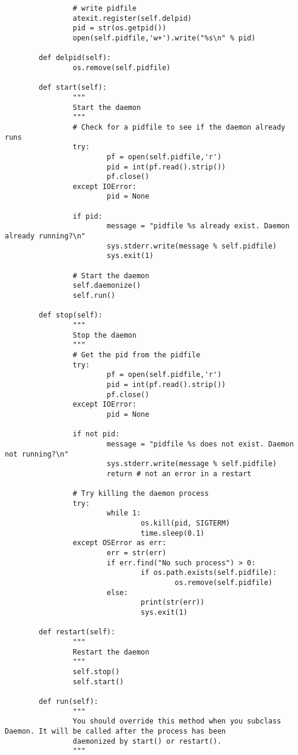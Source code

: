 \documentclass[12pt,a4paper]{scrartcl}
\begin{document}
\begin{verbatim}
                # write pidfile
                atexit.register(self.delpid)
                pid = str(os.getpid())
                open(self.pidfile,'w+').write("%s\n" % pid)

        def delpid(self):
                os.remove(self.pidfile)

        def start(self):
                """
                Start the daemon
                """
                # Check for a pidfile to see if the daemon already runs
                try:
                        pf = open(self.pidfile,'r')
                        pid = int(pf.read().strip())
                        pf.close()
                except IOError:
                        pid = None

                if pid:
                        message = "pidfile %s already exist. Daemon already running?\n"
                        sys.stderr.write(message % self.pidfile)
                        sys.exit(1)

                # Start the daemon
                self.daemonize()
                self.run()

        def stop(self):
                """
                Stop the daemon
                """
                # Get the pid from the pidfile
                try:
                        pf = open(self.pidfile,'r')
                        pid = int(pf.read().strip())
                        pf.close()
                except IOError:
                        pid = None

                if not pid:
                        message = "pidfile %s does not exist. Daemon not running?\n"
                        sys.stderr.write(message % self.pidfile)
                        return # not an error in a restart

                # Try killing the daemon process       
                try:
                        while 1:
                                os.kill(pid, SIGTERM)
                                time.sleep(0.1)
                except OSError as err:
                        err = str(err)
                        if err.find("No such process") > 0:
                                if os.path.exists(self.pidfile):
                                        os.remove(self.pidfile)
                        else:
                                print(str(err))
                                sys.exit(1)

        def restart(self):
                """
                Restart the daemon
                """
                self.stop()
                self.start()

        def run(self):
                """
                You should override this method when you subclass Daemon. It will be called after the process has been
                daemonized by start() or restart().
                """

\end{verbatim}
	\newpage
\end{document}
